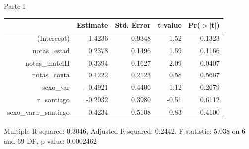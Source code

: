 \documentclass[pdf]{beamer}
\begin{document}
\begin{frame}{Parte I}

\begin{center}
\begin{table}[ht]
\centering
\begin{tabular}{rrrrr}
  \hline
 & Estimate & Std. Error & t value & Pr($>$$|$t$|$) \\ 
  \hline
(Intercept) & 1.4236 & 0.9348 & 1.52 & 0.1323 \\ 
  notas\_estad & 0.2378 & 0.1496 & 1.59 & 0.1166 \\ 
  notas\_mateIII & 0.3394 & 0.1627 & 2.09 & 0.0407 \\ 
  notas\_conta & 0.1222 & 0.2123 & 0.58 & 0.5667 \\ 
  sexo\_var & -0.4921 & 0.4406 & -1.12 & 0.2679 \\ 
  r\_santiago & -0.2032 & 0.3980 & -0.51 & 0.6112 \\ 
  sexo\_var:r\_santiago & 0.4234 & 0.5108 & 0.83 & 0.4100 \\ 
   \hline
\end{tabular}
\end{table}
\tiny{Multiple R-squared: 0.3046, Adjusted R-squared: 0.2442.
F-statistic: 5.038 on 6 and 69 DF, p-value: 0.0002462}
\end{center}

\end{frame}
\end{document}
